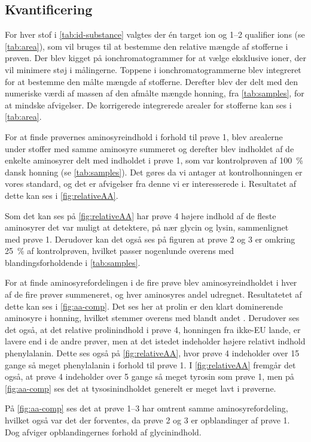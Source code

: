 \subsection{Kvantificering}
\par For hver stof i \cref{tab:id-substance} valgtes der én target ion og \numrange{1}{2} qualifier ions (se \cref{tab:area}), som vil bruges til at bestemme den relative mængde af stofferne i prøven.
Der blev kigget på ionchromatogrammer for at vælge eksklusive ioner, der vil minimere støj i målingerne.
Toppene i ionchromatogrammerne blev integreret for at bestemme den målte mængde af stofferne.
Derefter blev der delt med den numeriske værdi af massen af den afmålte mængde honning, fra \cref{tab:samples}, for at mindske afvigelser.
De korrigerede integrerede arealer for stofferne kan ses i \cref{tab:area}.

\par For at finde prøvernes aminosyreindhold i forhold til prøve \num{1}, blev arealerne under stoffer med samme aminosyre summeret
og derefter blev indholdet af de enkelte aminosyrer delt med indholdet i prøve \num{1}, som var kontrolprøven af \qty{100}{\percent} dansk honning (se \cref{tab:samples}).
Det gøres da vi antager at kontrolhonningen er vores standard, og det er afvigelser fra denne vi er interesserede i.
Resultatet af dette kan ses i \cref{fig:relativeAA}.

\par Som det kan ses på \cref{fig:relativeAA} har prøve \num{4} højere indhold af de fleste aminosyrer det var muligt at detektere, på nær glycin og lysin, sammenlignet med prøve 1.
Derudover kan det også ses på figuren at prøve 2 og 3 er omkring \qty{25}{\percent} af kontrolprøven, hvilket passer nogenlunde overens med blandingsforholdende i \cref{tab:samples}.

\par For at finde aminosyrefordelingen i de fire prøve blev aminosyreindholdet i hver af de fire prøver summeneret, og hver aminosyres andel udregnet.
Resultatetet af dette kan ses i \cref{fig:aa-comp}. Det ses her at prolin er den klart dominerende aminosyre i honning, hvilket stemmer overens med blandt andet \textcite{AAhoney,AAhoneyPl}.
Derudover ses det også, at det relative prolinindhold i prøve 4, honningen fra ikke-EU lande, er lavere end i de andre prøver, men at det istedet indeholder højere relativt indhold phenylalanin.
Dette ses også på \cref{fig:relativeAA}, hvor prøve 4 indeholder over \num{15} gange så meget phenylalanin i forhold til prøve 1.
I \cref{fig:relativeAA} fremgår det også, at prøve 4 indeholder over \num{5} gange så meget tyrosin som prøve 1, men på \cref{fig:aa-comp} ses det at tysosinindholdet generelt er meget lavt i prøverne.
\par På \cref{fig:aa-comp} ses det at prøve \numrange{1}{3} har omtrent samme aminosyrefordeling, hvilket også var det der forventes, da prøve 2 og 3 er opblandinger af prøve 1.
Dog afviger opblandingernes forhold af glycinindhold.
